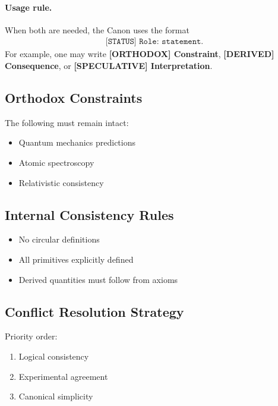 \documentclass[11pt]{article}
\theoremstyle{definition}
\theoremstyle{plain}
\theoremstyle{remark}
\begin{document}
        \paragraph{Usage rule.}
        When both are needed, the Canon uses the format
        \begin{align}
            \texttt{[STATUS] Role: statement.}
        \end{align}
        For example, one may write \textbf{[ORTHODOX] Constraint}, \textbf{[DERIVED] Consequence}, or \textbf{[SPECULATIVE] Interpretation}.
    
    \subsection{Orthodox Constraints}
        
        The following must remain intact:
        
        \begin{itemize}
            \item Quantum mechanics predictions
            \item Atomic spectroscopy
            \item Relativistic consistency
        \end{itemize}
    
    \subsection{Internal Consistency Rules}
        
        \begin{itemize}
            \item No circular definitions
            \item All primitives explicitly defined
            \item Derived quantities must follow from axioms
        \end{itemize}
    
    \subsection{Conflict Resolution Strategy}
        
        Priority order:
        
        \begin{enumerate}
            \item Logical consistency
            \item Experimental agreement
            \item Canonical simplicity
        \end{enumerate}
    
\end{document}
